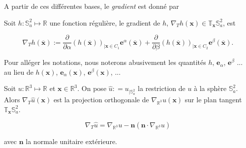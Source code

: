 A partir de ces différentes bases, le \textit{gradient} est donné par

\begin{proposition}
Soit $h : \mathbb{S}_a^2 \mapsto \mathbb{R}$ une fonction régulière, le gradient de $h$, $\nabla_T h(\mathbf{x}) \in \mathbb{T}_{\mathbf{x}}\mathbb{S}^2_a$, est

\begin{equation}
\nabla_{T} h(\overline{\mathbf{x}}) := \dfrac{\partial}{\partial \alpha} \left( h(\overline{\mathbf{x}}) \right)_{| \mathbf{x} \in C_1} \mathbf{e}^{\alpha}(\overline{\mathbf{x}}) + \dfrac{\partial}{\partial \beta}\left(  h(\overline{\mathbf{x}}) \right)_{| \mathbf{x} \in C_2} \mathbf{e}^{\beta}(\overline{\mathbf{x}}).
\label{eq: gradient}
\end{equation}
\end{proposition}

Pour alléger les notations, nous noterons abusivement les quantités $h$, $\mathbf{e}_{\alpha}$, $\mathbf{e}^{\beta}$ ... au lieu de $h(\mathbf{x})$, $\mathbf{e}_{\alpha}(\mathbf{x})$, $\mathbf{e}^{\beta}(\mathbf{x})$, ...


\begin{proposition}
Soit $u: \mathbb{R}^3 \mapsto \mathbb{R}$ et $\mathbf{x} \in \mathbb{R}^3$. On pose $\hat{u} : = u_{|\mathbb{S}_a^2}$ la restriction de $u$ à la sphère $\mathbb{S}_a^2$. Alors $\nabla_{T} \hat{u} (\mathbf{x})$ est la projection orthogonale de $\nabla_{\mathbb{R}^3} u (\mathbf{x})$ sur le plan tangent $\mathbb{T}_{\mathbf{x}} \mathbb{S}_a^2$.

\begin{equation}
\nabla_T \hat{u} = \nabla_{\mathbb{R}^3} u - \mathbf{n} \left( \mathbf{n} \cdot \nabla_{\mathbb{R}^3} u \right)
\end{equation}

avec $\mathbf{n}$ la normale unitaire extérieure.
\label{prop:gradient_project}
\end{proposition}

